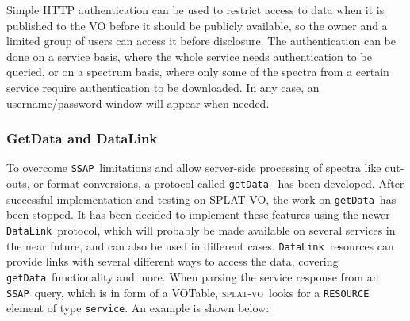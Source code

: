 \documentclass[final,authoryear,5p,times,twocolumn]{elsarticle}
\newcommand{\datalink}{\texttt{DataLink}}
\newcommand{\ssap}{\texttt{SSAP}}
\newcommand{\getdata}{\texttt{getData}}
\newcommand{\votable}{VOTable}
\newcommand{\splatvo}{\textsc{splat-vo}}
\begin{document}
Simple HTTP authentication can be used to restrict access to data when it is published to the VO before it should be
publicly available, so the owner and a limited group of users can
access it before disclosure. The authentication can be done on a
service basis, where the whole service needs authentication to be
queried, or on a spectrum basis, where only some of the spectra from a
certain service require authentication to be downloaded. In any case,
an username/password window will appear when needed.

\subsubsection{GetData and DataLink}

To overcome \ssap\ limitations and allow server-side processing of
spectra like cut-outs, or format conversions, a protocol called
\getdata\ \citep{getData}  has been developed. After successful implementation and
testing on SPLAT-VO, the work on \getdata\ has been stopped. It has been
decided to implement these features using the newer \datalink\
protocol, which will probably be made available on several services in
the near future, and can also be used in different cases.  \datalink\
resources can provide links with several different ways to access the data,
covering \getdata\ functionality and more.
When parsing the service response from an \ssap\ query, which is in form
of a \votable, \splatvo\ looks for a \texttt{RESOURCE} element of type \texttt{service}.
An example is shown below:
\end{document}

